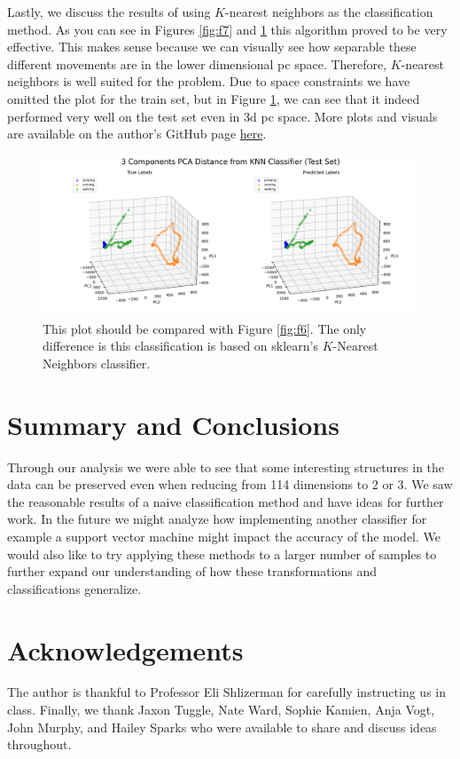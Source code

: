 \documentclass[11pt]{amsart}
\begin{document}
Lastly, we discuss the results of using $K$-nearest neighbors as the classification method.
As you can see in Figures \ref{fig:f7} and \ref{fig:f9} this algorithm proved to be very effective.
This makes sense because we can visually see how separable these different movements are in the lower dimensional pc space.
Therefore, $K$-nearest neighbors is well suited for the problem. Due to space constraints we have omitted the plot for the train set, but in Figure \ref{fig:f9}, we can see that it indeed performed very well on the test set even in 3d pc space.
More plots and visuals are available on the author's GitHub page \href{https://github.com/hunter-lybbert/uw-central/tree/main/data_analysis/hw_02/visualizations}{here}.

\begin{figure}[h]
	\centering
	\includegraphics[width=.75\textwidth]{../visualizations/pca_distance_from_knn_3d_test_set.png}
 	\caption{This plot should be compared with Figure \ref{fig:f6}. The only difference is this classification is based on sklearn's $K$-Nearest Neighbors classifier.}\label{fig:f9}
\end{figure}

\section{Summary and Conclusions}\label{sec:conclusions}
Through our analysis we were able to see that some interesting structures in the data can be preserved even when reducing from 114 dimensions to 2 or 3.
We saw the reasonable results of a naive classification method and have ideas for further work.
In the future we might analyze how implementing another classifier for example a support vector machine might impact the accuracy of the model.
We would also like to try applying these methods to a larger number of samples to further expand our understanding of how these transformations and classifications generalize.

\section*{Acknowledgements} 

The author is thankful to Professor Eli Shlizerman for carefully instructing us in class.
Finally, we thank Jaxon Tuggle, Nate Ward, Sophie Kamien, Anja Vogt, John Murphy, and Hailey Sparks who were available to share and discuss ideas throughout.


\end{document}
